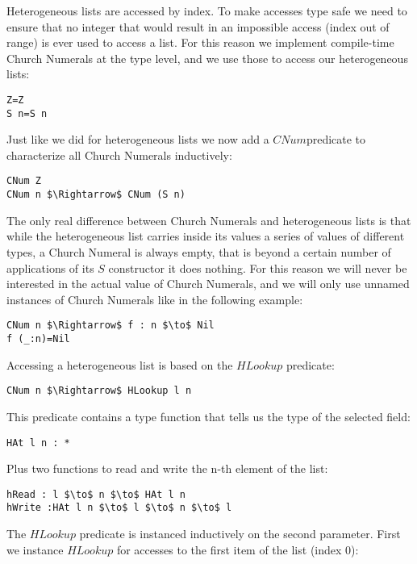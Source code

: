 \documentclass[a4paper]{article}
\begin{document}
\noindent Heterogeneous lists are accessed by index. To make accesses type safe we need to ensure that no integer that would result in an impossible access (index out of range) is ever used to access a list. For this reason we implement compile-time Church Numerals at the type level, and we use those to access our heterogeneous lists:

\begin{lstlisting}
Z=Z
S n=S n
\end{lstlisting}

Just like we did for heterogeneous lists we now add a $CNum $predicate to characterize all Church Numerals inductively:

\begin{lstlisting}
CNum Z
CNum n $\Rightarrow$ CNum (S n)
\end{lstlisting}


The only real difference between Church Numerals and heterogeneous lists is that while the heterogeneous list carries inside its values a series of values of different types, a Church Numeral is always empty, that is beyond a certain number of applications of its $S$ constructor it does nothing. For this reason we will never be interested in the actual value of Church Numerals, and we will only use unnamed instances of Church Numerals like in the following example:

\begin{lstlisting}
CNum n $\Rightarrow$ f : n $\to$ Nil
f (_:n)=Nil
\end{lstlisting}

Accessing a heterogeneous list is based on the $HLookup$ predicate:

\begin{lstlisting}
CNum n $\Rightarrow$ HLookup l n
\end{lstlisting}

This predicate contains a type function that tells us the type of the selected field:

\begin{lstlisting}
HAt l n : *
\end{lstlisting}

Plus two functions to read and write the n-th element of the list:

\begin{lstlisting}
hRead : l $\to$ n $\to$ HAt l n
hWrite :HAt l n $\to$ l $\to$ n $\to$ l
\end{lstlisting}

The $HLookup$ predicate is instanced inductively on the second parameter. First we instance $HLookup$ for accesses to the first item of the list (index $0$):
\end{document}
